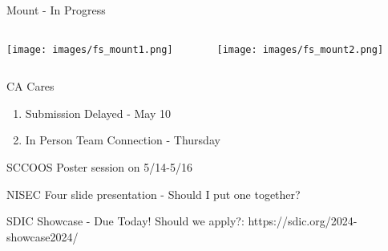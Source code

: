 \begin{frame}{Mount - In Progress}
    \begin{columns}
        \begin{column}{0.5\textwidth}
            \texttt{[image: images/fs\_mount1.png]}
        \end{column}
        \begin{column}{0.5\textwidth}
            \texttt{[image: images/fs\_mount2.png]}
        \end{column}
    \end{columns}
\end{frame}

\begin{frame}{CA Cares}
    \begin{enumerate}
        \item Submission Delayed - May 10
        \item In Person Team Connection - Thursday
    \end{enumerate}
\end{frame}

\begin{frame}{SCCOOS}
    Poster session on 5/14-5/16
\end{frame}

\begin{frame}{NISEC}
    Four slide presentation - Should I put one together?
\end{frame}

\begin{frame}{SDIC Showcase - Due Today!}
    Should we apply?: https://sdic.org/2024-showcase2024/
\end{frame}
